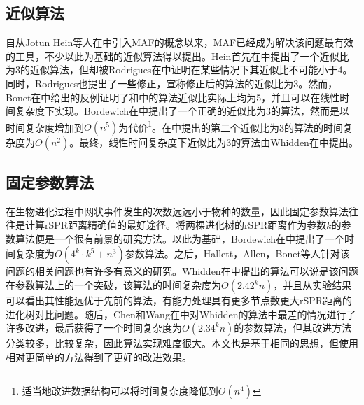 \subsection{近似算法}
自从Jotun Hein等人在\cite{hein1996complexity}中引入MAF的概念以来，MAF已经成为解决该问题最有效的工具，不少以此为基础的近似算法得以提出。Hein首先在\cite{hein1996complexity}中提出了一个近似比为3的近似算法，但却被Rodrigues在\cite{rodrigues2007maximum}中证明在某些情况下其近似比不可能小于4。同时，Rodrigues也提出了一些修正，宣称修正后的算法的近似比为3。然而，Bonet在\cite{bonet2006approximating}中给出的反例证明了\cite{hein1996complexity}和\cite{rodrigues2007maximum}中的算法近似比实际上均为5，并且可以在线性时间复杂度下实现。Bordewich在\cite{bordewich20083}中提出了一个正确的近似比为3的算法，然而是以时间复杂度增加到$O(n^5)$为代价\footnote{适当地改进数据结构可以将时间复杂度降低到$O(n^4)$}。在\cite{rodrigues2007maximum}中提出的第二个近似比为3的算法的时间复杂度为$O(n^2)$。最终，线性时间复杂度下近似比为3的算法由Whidden在\cite{whidden2009unifying}中提出。                                                                                                                                                                                                                                                             
\subsection{固定参数算法}
在生物进化过程中网状事件发生的次数远远小于物种的数量，因此固定参数算法往往是计算rSPR距离精确值的最好途径。将两棵进化树的rSPR距离作为参数$k$的参数算法便是一个很有前景的研究方法。以此为基础，Bordewich在\cite{bordewich20083}中提出了一个时间复杂度为$O(4^k \cdot k^5 + n^3)$参数算法。之后，Hallett，Allen，Bonet等人针对该问题的相关问题也有许多有意义的研究。Whidden在\cite{whidden2010fast}中提出的算法可以说是该问题在参数算法上的一个突破，该算法的时间复杂度为$O(2.42^kn)$，并且从实验结果可以看出其性能远优于先前的算法，有能力处理具有更多节点数更大rSPR距离的进化树对比问题。随后，Chen和Wang在\cite{chen2012faster}中对Whidden的算法中最差的情况进行了许多改进，最后获得了一个时间复杂度为$O(2.34^kn)$的参数算法，但其改进方法分类较多，比较复杂，因此算法实现难度很大。本文也是基于相同的思想，但使用相对更简单的方法得到了更好的改进效果。

